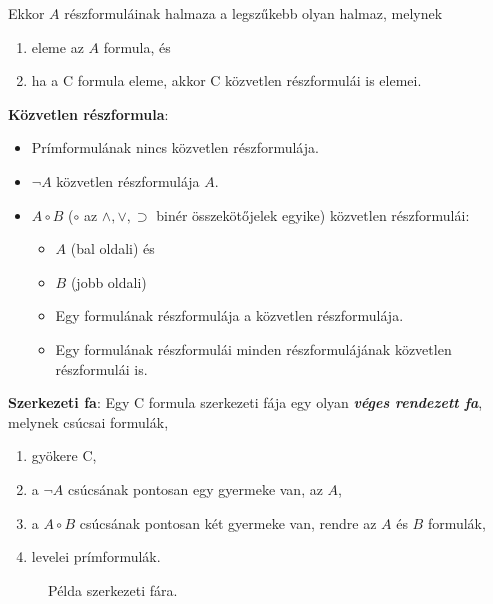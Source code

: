 \documentclass[tikz,12pt,margin=0px]{article}
\begin{document}
    \noindent Ekkor $A$ részformuláinak halmaza a legszűkebb olyan halmaz, melynek
	\begin{enumerate}
		\item eleme az $A$ formula, és
		\item ha a C formula eleme, akkor C közvetlen részformulái is elemei.
	\end{enumerate}
	
	\noindent \textbf{Közvetlen részformula}:
	\begin{itemize}
		\item Prímformulának nincs közvetlen részformulája.
		\item $\neg A$ közvetlen részformulája $A$.
		\item $A \circ B$ ($\circ$ az $\wedge, \vee, \supset$ binér összekötőjelek egyike) közvetlen részformulái:
        \begin{itemize}
            \item $A$ (bal oldali) és
            \item $B$ (jobb oldali)
        \end{itemize}
            \begin{itemize}
                \item Egy formulának részformulája a közvetlen részformulája.
                \item Egy formulának részformulái minden részformulájának közvetlen részformulái is.
            \end{itemize}
	\end{itemize}

	\noindent \textbf{Szerkezeti fa}: Egy C formula szerkezeti fája egy olyan \textbf{\emph{véges rendezett fa}}, melynek csúcsai formulák,
	\begin{enumerate}
		\item	gyökere C,
		\item	a $\neg A$ csúcsának pontosan egy gyermeke van, az $A$,
		\item	a $A \circ B$ csúcsának pontosan két gyermeke van, rendre az $A$ és $B$ formulák,
		\item	levelei prímformulák.
	\end{enumerate}
	
	\begin{figure}[H]
		\centering
		\caption{Példa szerkezeti fára.}
		\label{fig:szerkfa}
	\end{figure}
	
\end{document}
